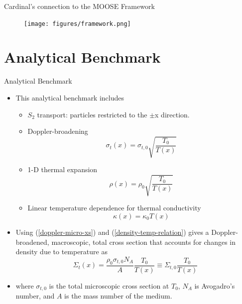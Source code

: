\documentclass[9pt,t]{beamer}
\begin{document}
\begin{frame}{Cardinal's connection to the MOOSE Framework}
    \begin{figure}[H]
        \centering
        \texttt{[image: figures/framework.png]}
    \end{figure}
\end{frame}


\section{Analytical Benchmark}
\begin{frame}{Analytical Benchmark}
    \pause
    \begin{itemize}
        \item <2-> This analytical benchmark includes
        \begin{itemize}
            \item <3-> $S_{2}$ transport: particles restricted to the $\pm$x direction.
            \item <4-> Doppler-broadening
            \begin{equation}\label{doppler-micro-xs}
                \sigma_{t}(x) = \sigma_{t,0}\sqrt{\frac{T_{0}}{T(x)}}
            \end{equation}
            \item <5-> 1-D thermal expansion
            \begin{equation} \label{density-temp-relation}
                \rho(x) =  \rho_{0} \sqrt{\frac{T_{0}}{T(x)}}
            \end{equation}
            \item <6-> Linear temperature dependence for thermal conductivity
            \begin{equation}\label{thermal-conductivity-temp-relation}
                \kappa(x) = \kappa_{0} T(x)
            \end{equation}
        \end{itemize}\vspace*{-0.4cm}
        \item <7->  Using (\ref{doppler-micro-xs}) and (\ref{density-temp-relation}) gives a Doppler-broadened, macroscopic, total cross section that accounts for changes in density due to temperature as
        \begin{equation}
            \Sigma_{t}(x) = \frac{\rho_{0}\sigma_{t,0} N_{A}}{A} \frac{T_{0}}{T(x)}
            \equiv\Sigma_{t,0}\frac{T_{0}}{T(x)}
        \end{equation}
        \item <7-> where $ \sigma_{t,0}$ is the total microscopic cross section at $T_{0}$, $N_{A}$ is Avogadro's number, and $A$ is the mass number
        of the medium.
        \end{itemize}
\end{frame}
\end{document}

